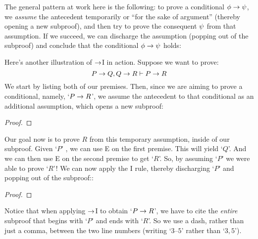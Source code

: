 The general pattern at work here is the following: to prove a conditional $\mathcal{\phi} \rightarrow \mathcal{\psi}$, we \emph{assume} the antecedent \meta{\phi} temporarily or ``for the sake of argument'' (thereby opening a new subproof), and then try to prove the consequent $\mathcal{\psi}$ from that assumption. If we succeed, we can discharge the assumption (popping out of the subproof) and conclude that the conditional $\mathcal{\phi} \rightarrow \mathcal{\psi}$ holds:

Here's another illustration of $\rightarrow$I in action. Suppose we want to prove:
	$$P \rightarrow Q, Q \rightarrow R \vdash P \rightarrow R$$
We start by listing both of our premises. Then, since we are aiming to prove a conditional, namely, `$P \rightarrow R$', we assume the antecedent to that conditional as an additional assumption, which opens a new subproof:
\begin{proof}
	  
	  
	\open
		  
		\have[\ ]{}{\vdots}
	\close
\end{proof}
Our goal now is to prove $R$ from this temporary assumption, inside of our subproof.  Given `$P$' , we can use {\eif}E on the first premise. This will yield `$Q$'. And we can then use {\eif}E on the second premise to get `$R$'. So, by assuming `$P$' we were able to prove `$R$'!  We can now apply the {\eif}I rule, thereby discharging `$P$' and popping out of the subproof::\label{HSproof}
\begin{proof}
	  
	  
	\open
		 
	\close
\end{proof}
Notice that when applying $\rightarrow$I to obtain `$P \rightarrow R$', we have to cite the \emph{entire} subproof that begins with `$P$' and ends with `$R$'.  So we use a dash, rather than just a comma, between the two line numbers (writing `$3$--$5$' rather than `$3,5$').

